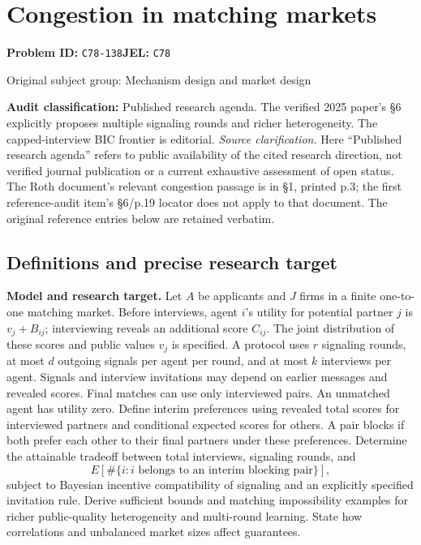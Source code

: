 \documentclass[11pt,a4paper]{article}
\begin{document}
\section*{Congestion in matching markets}
\textbf{Problem ID:} \texttt{C78-138}\quad \textbf{JEL:} \texttt{C78}\par
\label{problem:OP-0297}
{\sffamily\small\color{muted}Original subject group: Mechanism design and market design\par}
\label{definitions:problem:30007579}
\textbf{Audit classification:} Published research agenda. The verified 2025 paper’s §6 explicitly proposes multiple signaling rounds and richer heterogeneity. The capped-interview BIC frontier is editorial.
\emph{Source clarification.} Here ``Published research agenda'' refers to public availability of the cited research direction, not verified journal publication or a current exhaustive assessment of open status. The Roth document's relevant congestion passage is in §1, printed p.3; the first reference-audit item's §6/p.19 locator does not apply to that document. The original reference entries below are retained verbatim.
\subsection*{Definitions and precise research target}
\textbf{Model and research target.} Let \(A\) be applicants and \(J\) firms in a finite one-to-one matching market. Before interviews, agent \(i\)'s utility for potential partner \(j\) is \(v_j+B_{ij}\); interviewing reveals an additional score \(C_{ij}\). The joint distribution of these scores and public values \(v_j\) is specified. A protocol uses \(r\) signaling rounds, at most \(d\) outgoing signals per agent per round, and at most \(k\) interviews per agent. Signals and interview invitations may depend on earlier messages and revealed scores. Final matches can use only interviewed pairs. An unmatched agent has utility zero. Define interim preferences using revealed total scores for interviewed partners and conditional expected scores for others. A pair blocks if both prefer each other to their final partners under these preferences. Determine the attainable tradeoff between total interviews, signaling rounds, and
\[
 E[\#\{i:i\text{ belongs to an interim blocking pair}\}],
\]
subject to Bayesian incentive compatibility of signaling and an explicitly specified invitation rule. Derive sufficient bounds and matching impossibility examples for richer public-quality heterogeneity and multi-round learning. State how correlations and unbalanced market sizes affect guarantees.
\end{document}
